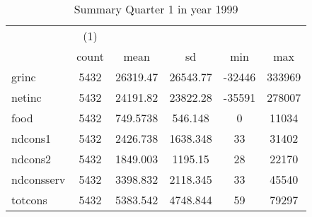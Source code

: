 \begin{table}[htbp]\centering
\def\sym#1{\ifmmode^{#1}\else\(^{#1}\)\fi}
\caption{Summary Quarter 1 in year 1999 \label{sum\_Q1\_y1999}}
\begin{tabular}{l*{1}{ccccc}}
\hline\hline
            &\multicolumn{1}{c}{(1)}&            &            &            &            \\
            &       count&        mean&          sd&         min&         max\\
\hline
grinc       &        5432&    26319.47&    26543.77&      -32446&      333969\\
netinc      &        5432&    24191.82&    23822.28&      -35591&      278007\\
food        &        5432&    749.5738&     546.148&           0&       11034\\
ndcons1     &        5432&    2426.738&    1638.348&          33&       31402\\
ndcons2     &        5432&    1849.003&     1195.15&          28&       22170\\
ndconsserv  &        5432&    3398.832&    2118.345&          33&       45540\\
totcons     &        5432&    5383.542&    4748.844&          59&       79297\\
\hline\hline
\end{tabular}
\end{table}
